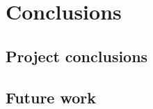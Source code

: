 \documentclass[\main/main.tex]{subfiles}
\begin{document}
\chapter{Conclusions}
\section{Project conclusions}
\section{Future work}
\end{document}
